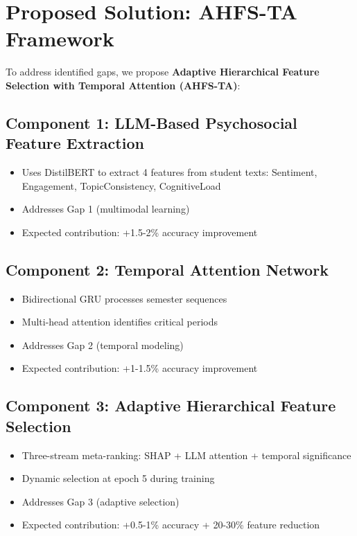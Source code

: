 \section{Proposed Solution: AHFS-TA Framework}

To address identified gaps, we propose \textbf{Adaptive Hierarchical Feature Selection with Temporal Attention (AHFS-TA)}:

\subsection{Component 1: LLM-Based Psychosocial Feature Extraction}

\begin{itemize}
\item Uses DistilBERT to extract 4 features from student texts: Sentiment, Engagement, TopicConsistency, CognitiveLoad
\item Addresses Gap 1 (multimodal learning)
\item Expected contribution: +1.5-2\% accuracy improvement
\end{itemize}

\subsection{Component 2: Temporal Attention Network}

\begin{itemize}
\item Bidirectional GRU processes semester sequences
\item Multi-head attention identifies critical periods
\item Addresses Gap 2 (temporal modeling)
\item Expected contribution: +1-1.5\% accuracy improvement
\end{itemize}

\subsection{Component 3: Adaptive Hierarchical Feature Selection}

\begin{itemize}
\item Three-stream meta-ranking: SHAP + LLM attention + temporal significance
\item Dynamic selection at epoch 5 during training
\item Addresses Gap 3 (adaptive selection)
\item Expected contribution: +0.5-1\% accuracy + 20-30\% feature reduction
\end{itemize}

